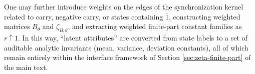 \begin{remark}
One may further introduce weights on the edges of the synchronization kernel related to carry, negative carry, or states containing $\overline{1}$, constructing weighted matrices $B_\theta$ and $\zeta_{B,\theta}$, and extracting weighted finite-part constant families as $r\uparrow 1$. In this way, ``latent attributes'' are converted from state labels to a set of auditable analytic invariants (mean, variance, deviation constants), all of which remain entirely within the interface framework of Section \ref{sec:zeta-finite-part} of the main text.
\end{remark}

